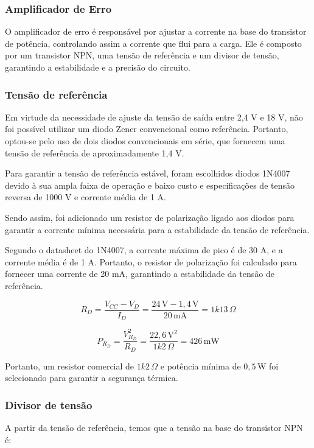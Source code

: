 \subsubsection{Amplificador de Erro}

O amplificador de erro é responsável por ajustar a corrente na base do transistor de potência, controlando assim a corrente que flui para a carga. Ele é composto por um transistor NPN, uma tensão de referência e um divisor de tensão, garantindo a estabilidade e a precisão do circuito.

\subsubsection*{Tensão de referência}

Em virtude da necessidade de ajuste da tensão de saída entre 2,4 V e 18 V, não foi possível utilizar um diodo Zener convencional como referência. Portanto, optou-se pelo uso de dois diodos convencionais em série, que fornecem uma tensão de referência de aproximadamente 1,4 V.

Para garantir a tensão de referência estável, foram escolhidos diodos 1N4007 devido à sua ampla faixa de operação e baixo custo e especificações de tensão reversa de 1000 V e corrente média de 1 A.

Sendo assim, foi adicionado um resistor de polarização ligado aos diodos para garantir a corrente mínima necessária para a estabilidade da tensão de referência.

Segundo o datasheet do 1N4007, a corrente máxima de pico é de 30 A, e a corrente média é de 1 A. Portanto, o resistor de polarização foi calculado para fornecer uma corrente de 20 mA, garantindo a estabilidade da tensão de referência.

\[
R_D = \frac{V_{CC} - V_{D}}{I_{D}} = \frac{24 \, \text{V} - 1,4 \, \text{V}}{20 \, \text{mA}} = 1k13 \, \Omega
\]

\[
P_{R_D} = \frac{V_{R_D}^2}{R_D} = \frac{22,6 \, \text{V}^2}{1k2 \, \Omega} = 426 \, \text{mW}
\]

Portanto, um resistor comercial de \(1k2 \, \Omega\) e potência mínima de \(0,5 \, \text{W}\) foi selecionado para garantir a segurança térmica.

\subsubsection*{Divisor de tensão}

A partir da tensão de referência, temos que a tensão na base do transistor NPN é:

